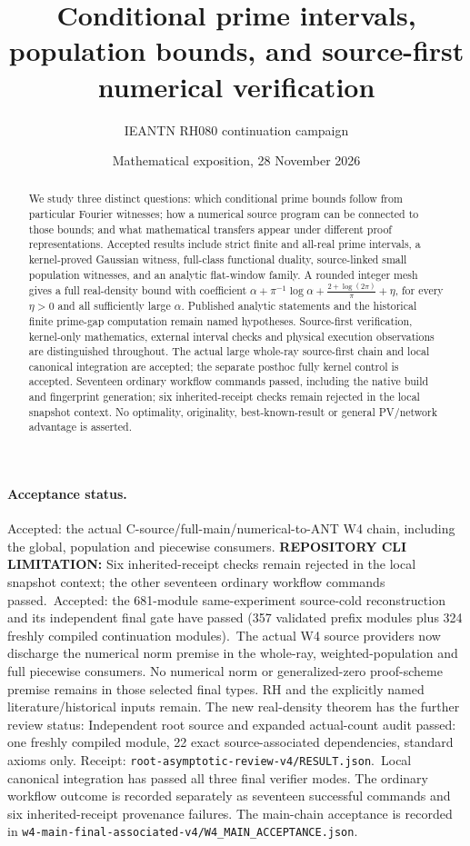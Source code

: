 \documentclass[11pt]{article}
\title{Conditional prime intervals, population bounds, and source-first numerical verification}
\author{IEANTN RH080 continuation campaign}
\date{Mathematical exposition, 28 November 2026}
\newcommand{\Kflat}{\frac{2+\log(2\pi)}{\pi}}
\newcommand{\Pending}[1]{\textcolor{red!65!black}{\textbf{REPOSITORY CLI LIMITATION:} #1}}
\newcommand{\WfourGateStatus}{Accepted: the actual C-source/full-main/numerical-to-ANT W4 chain, including the global, population and piecewise consumers. \Pending{Six inherited-receipt checks remain rejected in the local snapshot context; the other seventeen ordinary workflow commands passed.}}
\newcommand{\FiniteReplayStatus}{Accepted: the 681-module same-experiment
source-cold reconstruction and its independent final gate have passed
(357 validated prefix modules plus 324 freshly compiled continuation modules).}
\newcommand{\RealAlphaReviewStatus}{Independent root source and expanded actual-count audit passed: one freshly compiled module, 22 exact source-associated dependencies, standard axioms only. Receipt: \texttt{root-asymptotic-review-v4/RESULT.json}.}
\begin{document}
\maketitle
\begin{abstract}
We study three distinct questions: which conditional prime bounds follow from
particular Fourier witnesses; how a numerical source program can be connected
to those bounds; and what mathematical transfers appear under different proof
representations. Accepted results include strict finite and all-real prime intervals,
a kernel-proved Gaussian witness, full-class functional duality, source-linked
small population witnesses, and an analytic flat-window family. A rounded
integer mesh gives a full real-density bound with coefficient
\(\alpha+\pi^{-1}\log\alpha+\Kflat+\eta\), for every \(\eta>0\) and all
sufficiently large \(\alpha\). Published analytic statements and the historical
finite prime-gap computation remain named hypotheses. Source-first
verification, kernel-only mathematics, external interval checks and physical
execution observations are distinguished throughout. The actual large
whole-ray source-first chain and local canonical integration are accepted;
the separate posthoc fully kernel control is accepted. Seventeen ordinary workflow commands passed, including the native build and
fingerprint generation; six inherited-receipt checks remain rejected in the
local snapshot context. No optimality, originality,
best-known-result or general PV/network advantage is asserted.
\end{abstract}

\paragraph{Acceptance status.}
\WfourGateStatus\ \FiniteReplayStatus\
The actual W4 source providers now discharge the numerical norm premise in
the whole-ray, weighted-population and full piecewise consumers. No numerical
norm or generalized-zero proof-scheme premise remains in those selected final
types. RH and the explicitly named literature/historical inputs remain.
The new real-density theorem has the further review status:
\RealAlphaReviewStatus\ Local canonical integration has passed all three final verifier modes.
The ordinary workflow outcome is recorded separately as seventeen successful
commands and six inherited-receipt provenance failures. The main-chain acceptance is recorded
in \nolinkurl{w4-main-final-associated-v4/W4_MAIN_ACCEPTANCE.json}.
\end{document}
